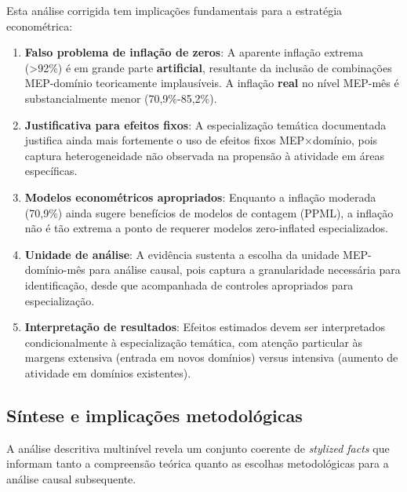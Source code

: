 Esta análise corrigida tem implicações fundamentais para a estratégia econométrica:

\begin{enumerate}
    \item \textbf{Falso problema de inflação de zeros}: A aparente inflação extrema (>92\%) é em grande parte \textbf{artificial}, resultante da inclusão de combinações MEP-domínio teoricamente implausíveis. A inflação \textbf{real} no nível MEP-mês é substancialmente menor (70,9\%-85,2\%).
    
    \item \textbf{Justificativa para efeitos fixos}: A especialização temática documentada justifica ainda mais fortemente o uso de efeitos fixos MEP×domínio, pois captura heterogeneidade não observada na propensão à atividade em áreas específicas.
    
    \item \textbf{Modelos econométricos apropriados}: Enquanto a inflação moderada (70,9\%) ainda sugere benefícios de modelos de contagem (PPML), a inflação não é tão extrema a ponto de requerer modelos zero-inflated especializados.
    
    \item \textbf{Unidade de análise}: A evidência sustenta a escolha da unidade MEP-domínio-mês para análise causal, pois captura a granularidade necessária para identificação, desde que acompanhada de controles apropriados para especialização.
    
    \item \textbf{Interpretação de resultados}: Efeitos estimados devem ser interpretados condicionalmente à especialização temática, com atenção particular às margens extensiva (entrada em novos domínios) versus intensiva (aumento de atividade em domínios existentes).
\end{enumerate}

\subsection{Síntese e implicações metodológicas}

A análise descritiva multinível revela um conjunto coerente de \textit{stylized facts} que informam tanto a compreensão teórica quanto as escolhas metodológicas para a análise causal subsequente.


